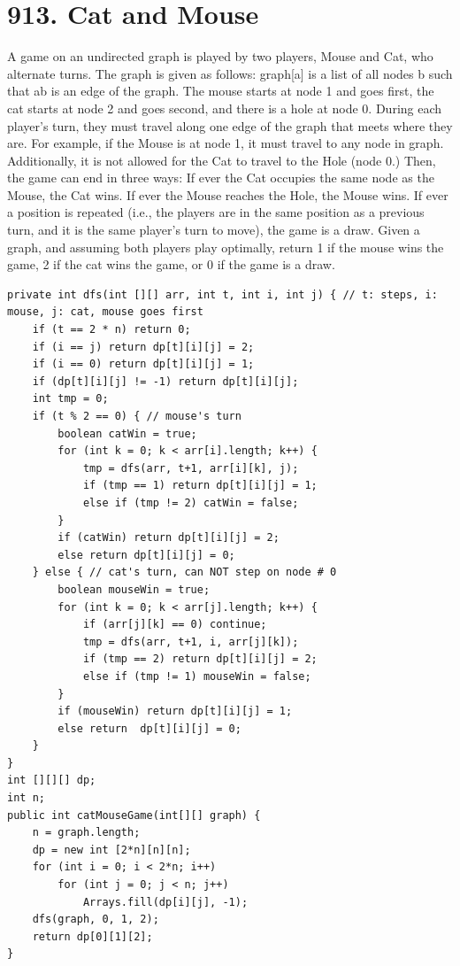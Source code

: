 \documentclass[9pt, b5paaper]{book}
\begin{document}
\section{913. Cat and Mouse}
\label{sec-2-19}
A game on an undirected graph is played by two players, Mouse and Cat, who alternate turns.
The graph is given as follows: graph[a] is a list of all nodes b such that ab is an edge of the graph.
The mouse starts at node 1 and goes first, the cat starts at node 2 and goes second, and there is a hole at node 0.
During each player's turn, they must travel along one edge of the graph that meets where they are.  For example, if the Mouse is at node 1, it must travel to any node in graph\footnotemark[3]{}.
Additionally, it is not allowed for the Cat to travel to the Hole (node 0.)
Then, the game can end in three ways:
If ever the Cat occupies the same node as the Mouse, the Cat wins.
If ever the Mouse reaches the Hole, the Mouse wins.
If ever a position is repeated (i.e., the players are in the same position as a previous turn, and it is the same player's turn to move), the game is a draw.
Given a graph, and assuming both players play optimally, return
1 if the mouse wins the game,
2 if the cat wins the game, or
0 if the game is a draw.
\begin{verbatim}
private int dfs(int [][] arr, int t, int i, int j) { // t: steps, i: mouse, j: cat, mouse goes first
    if (t == 2 * n) return 0;
    if (i == j) return dp[t][i][j] = 2;
    if (i == 0) return dp[t][i][j] = 1;
    if (dp[t][i][j] != -1) return dp[t][i][j];
    int tmp = 0;
    if (t % 2 == 0) { // mouse's turn
        boolean catWin = true;
        for (int k = 0; k < arr[i].length; k++) {
            tmp = dfs(arr, t+1, arr[i][k], j);
            if (tmp == 1) return dp[t][i][j] = 1;
            else if (tmp != 2) catWin = false;
        }
        if (catWin) return dp[t][i][j] = 2;
        else return dp[t][i][j] = 0;
    } else { // cat's turn, can NOT step on node # 0
        boolean mouseWin = true;
        for (int k = 0; k < arr[j].length; k++) {
            if (arr[j][k] == 0) continue;
            tmp = dfs(arr, t+1, i, arr[j][k]);
            if (tmp == 2) return dp[t][i][j] = 2;
            else if (tmp != 1) mouseWin = false;
        }
        if (mouseWin) return dp[t][i][j] = 1;
        else return  dp[t][i][j] = 0;
    }
}
int [][][] dp;
int n;
public int catMouseGame(int[][] graph) {
    n = graph.length;
    dp = new int [2*n][n][n];
    for (int i = 0; i < 2*n; i++) 
        for (int j = 0; j < n; j++)
            Arrays.fill(dp[i][j], -1);
    dfs(graph, 0, 1, 2);
    return dp[0][1][2];
}
\end{verbatim}
\end{document}
